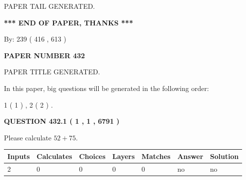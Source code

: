 \documentclass[12pt]{article}
\begin{document}
   
   
\vspace{2.0in} PAPER TAIL GENERATED.
   
   
   
   
\vspace{1.0in} 
{\textbf{\large{ *** END OF PAPER, THANKS *** }}} 
   
   
\hspace{1.0in} By: 
 239 ( 416 ,  613 )
   
   
   
   
\newpage 
\setcounter{page}{ 
   432001 } 
   
   
   
   
 {\textbf{ \Large{ PAPER NUMBER  432  }}}
   
   
\vspace{0.2in}
   
   
   
   
   
   
   
   
 \vspace{0.2in}
 
 
 
 
   
   
 PAPER TITLE GENERATED.
   
   
   
\vspace{0.2in}
   
In this paper, big questions will be generated in the following order: 
   
   
   1 ( 1 )
 ,
   2 ( 2 )
 .
  
\vspace{0.2in}
  
{\textbf{\Large{QUESTION
432.1 
 ( 1 , 1 , 6791 )
}}}
  
  
 
Please calculate $ %
52 +  %
75 $.
 
 
   
   
   
   
\noindent\begin{tabular}{|l|l|l|l|l|l|l|}
 \hline
Inputs & Calculates & Choices & Layers & Matches & Answer & Solution \\ \hline
 2  & 
 0  & 
 0
  & 
 0  & 
 0  & 
  no & 
  no 
  \\ \hline
 \end{tabular}
   
\end{document}
